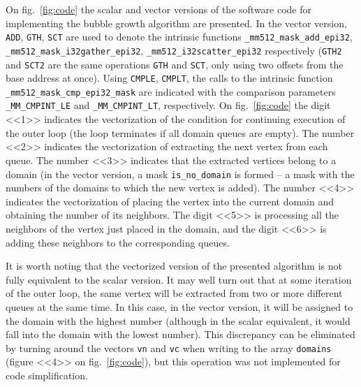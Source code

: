 \documentclass[
11pt,%
tightenlines,%
twoside,%
onecolumn,%
nofloats,%
nobibnotes,%
nofootinbib,%
superscriptaddress,%
noshowpacs,%
centertags]%
{revtex4}
\begin{document}
On fig.~\ref{fig:code} the scalar and vector versions of the software code for implementing the bubble growth algorithm are presented.
In the vector version, \texttt{ADD}, \texttt{GTH}, \texttt{SCT} are used to denote the intrinsic functions \texttt{\_mm512\_mask\_add\_epi32}, \texttt{\_mm512\_mask\_i32gather\_epi32}, \texttt{\_mm512\_i32scatter\_epi32} respectively (\texttt{GTH2} and \texttt{SCT2} are the same operations \texttt{GTH} and \texttt{SCT}, only using two offsets from the base address at once).
Using \texttt{CMPLE}, \texttt{CMPLT}, the calls to the intrinsic function \texttt{\_mm512\_mask\_cmp\_epi32\_mask} are indicated with the comparison parameters \texttt{\_MM\_CMPINT\_LE} and \texttt{\_MM\_CMPINT\_LT}, respectively.
On fig.~\ref{fig:code} the digit <<1>> indicates the vectorization of the condition for continuing execution of the outer loop (the loop terminates if all domain queues are empty).
The number <<2>> indicates the vectorization of extracting the next vertex from each queue.
The number <<3>> indicates that the extracted vertices belong to a domain (in the vector version, a mask \texttt{is\_no\_domain} is formed -- a mask with the numbers of the domains to which the new vertex is added).
The number <<4>> indicates the vectorization of placing the vertex into the current domain and obtaining the number of its neighbors.
The digit <<5>> is processing all the neighbors of the vertex just placed in the domain, and the digit <<6>> is adding these neighbors to the corresponding queues.

It is worth noting that the vectorized version of the presented algorithm is not fully equivalent to the scalar version.
It may well turn out that at some iteration of the outer loop, the same vertex will be extracted from two or more different queues at the same time.
In this case, in the vector version, it will be assigned to the domain with the highest number (although in the scalar equivalent, it would fall into the domain with the lowest number).
This discrepancy can be eliminated by turning around the vectors \texttt{vn} and \texttt{vc} when writing to the array \texttt{domains} (figure <<4>> on fig.~\ref{fig:code}), but this operation was not implemented for code simplification.
\end{document}
